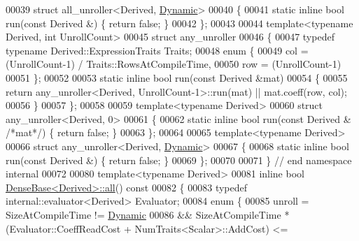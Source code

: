 \begin{DoxyCode}
00039 \textcolor{keyword}{struct }all\_unroller<Derived, \hyperlink{namespace_eigen_ad81fa7195215a0ce30017dfac309f0b2}{Dynamic}>
00040 \{
00041   \textcolor{keyword}{static} \textcolor{keyword}{inline} \textcolor{keywordtype}{bool} run(\textcolor{keyword}{const} Derived &) \{ \textcolor{keywordflow}{return} \textcolor{keyword}{false}; \}
00042 \};
00043 
00044 \textcolor{keyword}{template}<\textcolor{keyword}{typename} Derived, \textcolor{keywordtype}{int} UnrollCount>
00045 \textcolor{keyword}{struct }any\_unroller
00046 \{
00047   \textcolor{keyword}{typedef} \textcolor{keyword}{typename} Derived::ExpressionTraits Traits;
00048   \textcolor{keyword}{enum} \{
00049     col = (UnrollCount-1) / Traits::RowsAtCompileTime,
00050     row = (UnrollCount-1) %
00051   \};
00052   
00053   \textcolor{keyword}{static} \textcolor{keyword}{inline} \textcolor{keywordtype}{bool} run(\textcolor{keyword}{const} Derived &mat)
00054   \{
00055     \textcolor{keywordflow}{return} any\_unroller<Derived, UnrollCount-1>::run(mat) || mat.coeff(row, col);
00056   \}
00057 \};
00058 
00059 \textcolor{keyword}{template}<\textcolor{keyword}{typename} Derived>
00060 \textcolor{keyword}{struct }any\_unroller<Derived, 0>
00061 \{
00062   \textcolor{keyword}{static} \textcolor{keyword}{inline} \textcolor{keywordtype}{bool} run(\textcolor{keyword}{const} Derived & \textcolor{comment}{/*mat*/}) \{ \textcolor{keywordflow}{return} \textcolor{keyword}{false}; \}
00063 \};
00064 
00065 \textcolor{keyword}{template}<\textcolor{keyword}{typename} Derived>
00066 \textcolor{keyword}{struct }any\_unroller<Derived, \hyperlink{namespace_eigen_ad81fa7195215a0ce30017dfac309f0b2}{Dynamic}>
00067 \{
00068   \textcolor{keyword}{static} \textcolor{keyword}{inline} \textcolor{keywordtype}{bool} run(\textcolor{keyword}{const} Derived &) \{ \textcolor{keywordflow}{return} \textcolor{keyword}{false}; \}
00069 \};
00070 
00071 \} \textcolor{comment}{// end namespace internal}
00072 
00080 \textcolor{keyword}{template}<\textcolor{keyword}{typename} Derived>
00081 \textcolor{keyword}{inline} \textcolor{keywordtype}{bool} \hyperlink{group___core___module_ae42ab60296c120e9f45ce3b44e1761a4}{DenseBase<Derived>::all}()\textcolor{keyword}{ const}
00082 \textcolor{keyword}{}\{
00083   \textcolor{keyword}{typedef} internal::evaluator<Derived> Evaluator;
00084   \textcolor{keyword}{enum} \{
00085     unroll = SizeAtCompileTime != \hyperlink{namespace_eigen_ad81fa7195215a0ce30017dfac309f0b2}{Dynamic}
00086           && SizeAtCompileTime * (Evaluator::CoeffReadCost + NumTraits<Scalar>::AddCost) <= 

\end{DoxyCode}
